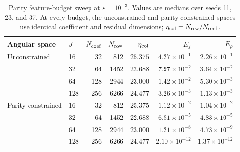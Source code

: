 \begin{table}[t]
\centering
\caption{Parity feature-budget sweep at $\varepsilon=10^{-3}$. Values are medians over seeds 11, 23, and 37. At every budget, the unconstrained and parity-constrained spaces use identical coefficient and residual dimensions; $\eta_{\rm col}=N_{\rm row}/N_{\rm coef}$.}
\label{tab:parity-budget}
\begin{tabular}{llrrrrr}
\toprule
Angular space & $J$ & $N_{\rm coef}$ & $N_{\rm row}$ & $\eta_{\rm col}$ & $E_f$ & $E_\rho$\\
\midrule
Unconstrained & 16 & 32 & 812 & $25.375$ & $4.27\times10^{-1}$ & $2.26\times10^{-1}$\\
 & 32 & 64 & 1452 & $22.688$ & $7.97\times10^{-2}$ & $3.64\times10^{-2}$\\
 & 64 & 128 & 2944 & $23.000$ & $1.42\times10^{-2}$ & $5.30\times10^{-3}$\\
 & 128 & 256 & 6266 & $24.477$ & $3.26\times10^{-3}$ & $1.13\times10^{-3}$\\
Parity-constrained & 16 & 32 & 812 & $25.375$ & $1.12\times10^{-2}$ & $1.04\times10^{-2}$\\
 & 32 & 64 & 1452 & $22.688$ & $6.81\times10^{-5}$ & $4.83\times10^{-5}$\\
 & 64 & 128 & 2944 & $23.000$ & $1.21\times10^{-8}$ & $4.73\times10^{-9}$\\
 & 128 & 256 & 6266 & $24.477$ & $2.10\times10^{-12}$ & $1.37\times10^{-12}$\\
\bottomrule
\end{tabular}
\end{table}
